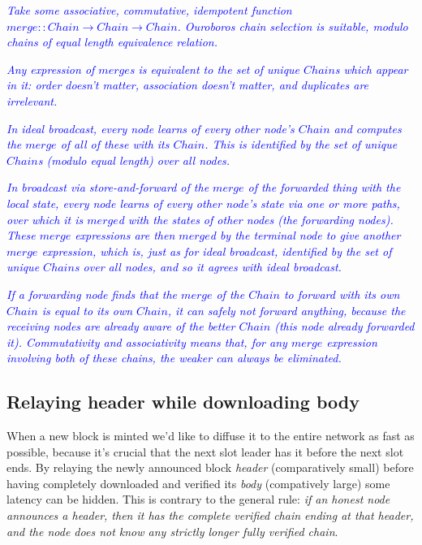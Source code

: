 \documentclass{article}
\newcommand{\avieth}[1]{\textcolor{blue}{\emph{#1}}}
\theoremstyle{definition}{
  \newtheorem{lemma}{Lemma}[section] %
  \newtheorem{definition}[lemma]{Definition}
}
\theoremstyle{theorem}{
  \newtheorem{invariant}[lemma]{Invariant}
  \newtheorem{proofobligation}[lemma]{Proof Obligation}
}
\numberwithin{equation}{lemma}
\begin{document}
  \avieth{Take some associative, commutative, idempotent function
    $merge :: Chain \rightarrow Chain \rightarrow Chain$.
    Ouroboros chain selection is suitable,
    modulo chains of equal length equivalence relation.}

  \avieth{Any expression of $merge$s is equivalent to the set of unique $Chain$s
    which appear in it: order doesn't matter, association doesn't matter, and
    duplicates are irrelevant.}

  \avieth{In ideal broadcast, every node learns of every other node's $Chain$
    and computes the $merge$ of all of these with its $Chain$. This is
    identified by the set of unique $Chain$s (modulo equal length) over all
    nodes.}

  \avieth{In broadcast via store-and-forward of the $merge$ of the forwarded
    thing with the local state, every node learns of every other node's state
    via one or more paths, over which it is $merge$d with the states of other
    nodes (the forwarding nodes). These $merge$ expressions are then $merge$d
    by the terminal node to give another $merge$ expression, which is, just as
    for ideal broadcast, identified by the set of unique $Chain$s over all
    nodes, and so it agrees with ideal broadcast.}

  \avieth{If a forwarding node finds that the $merge$ of the $Chain$ to forward
    with its own $Chain$ is equal to its own $Chain$, it can safely not forward
    anything, because the receiving nodes are already aware of the better
    $Chain$ (this node already forwarded it). Commutativity and associativity
    means that, for any $merge$ expression involving both of these chains, the
    weaker can always be eliminated.\\}

\subsection{Relaying header while downloading body}

When a new block is minted we'd like to diffuse it to the entire network as
fast as possible, because it's crucial that the next slot leader has it before
the next slot ends. By relaying the newly announced block \emph{header}
(comparatively small) before having completely downloaded and verified its
\emph{body} (compatively large) some latency can be hidden. This is contrary
to the general rule: \emph{if an honest node announces a header, then it has
the complete verified chain ending at that header, and the node does not know
any strictly longer fully verified chain}.
\end{document}

